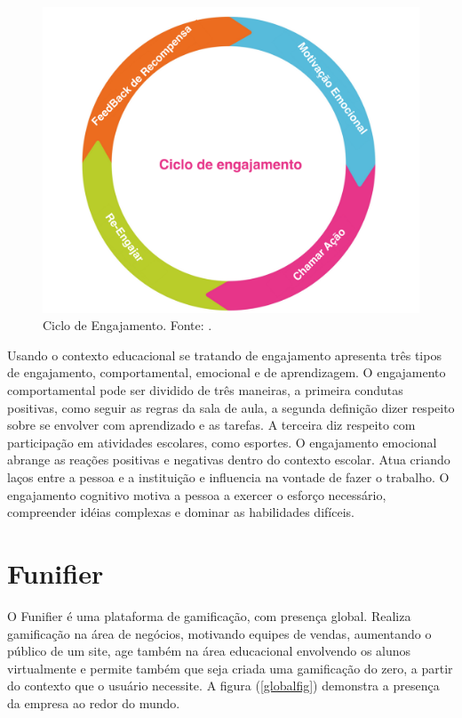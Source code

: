 \begin{figure}[h]
	\centering
		\includegraphics[keepaspectratio=true,scale=0.3]{figuras/ciclofig.png}
	\caption{Ciclo de Engajamento. Fonte: \cite{kumar2013gamification}.\label{ciclofig}
}
\end{figure}


Usando o contexto educacional se tratando de engajamento \cite{fredericks2004school} apresenta três tipos de engajamento, comportamental, emocional e de aprendizagem.
O engajamento comportamental pode ser dividido de três maneiras, a primeira condutas positivas, como seguir as regras da sala de aula, a segunda definição dizer respeito sobre se envolver com aprendizado e as tarefas. A terceira diz respeito com participação em atividades escolares, como esportes. O engajamento emocional abrange as reações positivas e negativas dentro do contexto escolar. Atua criando laços entre a pessoa e a instituição e influencia na vontade de fazer o trabalho. O engajamento cognitivo  motiva a pessoa a exercer o esforço necessário, compreender idéias complexas e dominar as habilidades difíceis. 

\section{Funifier}

O Funifier é uma plataforma de gamificação, com presença global. Realiza gamificação na área de negócios, motivando equipes de vendas, aumentando o público de um site, age também na área educacional envolvendo os alunos virtualmente e permite também que seja criada uma gamificação do zero, a partir do contexto que o usuário necessite\cite{funifier}. A figura (\ref{globalfig}) demonstra a presença da empresa ao redor do mundo.


